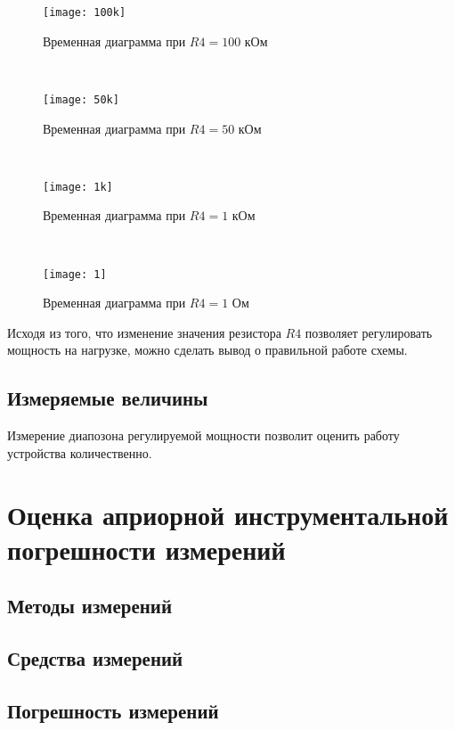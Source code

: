 \begin{figure}[H]
\begin{center}
	\texttt{[image: 100k]}
	\caption{Временная диаграмма при $R4 = 100$ кОм}
	\label{pic:diag:100k}
\end{center}
\end{figure}

~

\begin{figure}[H]
\begin{center}
	\texttt{[image: 50k]}
	\caption{Временная диаграмма при $R4 = 50$ кОм}
	\label{pic:diag:50k}
\end{center}
\end{figure}

~

\begin{figure}[H]
\begin{center}
	\texttt{[image: 1k]}
	\caption{Временная диаграмма при $R4 = 1$ кОм}
	\label{pic:diag:1k}
\end{center}
\end{figure}

~

\begin{figure}[H]
\begin{center}
	\texttt{[image: 1]}
	\caption{Временная диаграмма при $R4 = 1$ Ом}
	\label{pic:diag:1}
\end{center}
\end{figure}

Исходя из того, что изменение значения резистора $R4$ позволяет регулировать мощность на нагрузке, можно сделать вывод о правильной работе схемы.

\subsection{Измеряемые величины}

Измерение диапозона регулируемой мощности позволит оценить работу устройства количественно.

\section{Оценка априорной инструментальной погрешности измерений}

\subsection{Методы измерений}

\subsection{Средства измерений}

\subsection{Погрешность измерений}



